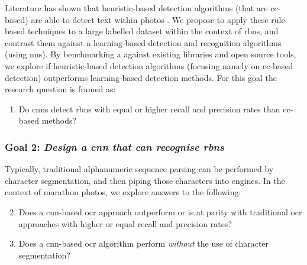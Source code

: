 Literature has shown that heuristic-based detection algorithms (that are \gls{cc}-based) are able to detect text within photos \citep{Li:2012wd, Chen:2011ul, Eichner:2008dw}. We propose to apply these rule-based techniques to a large labelled dataset within the context of \glspl{rbn}, and contrast them against a learning-based detection and recognition algorithms (using \glspl{nn}). By benchmarking a against existing libraries and open source tools, we explore if heuristic-based detection algorithms (focusing namely on \gls{cc}-based detection) outperforms learning-based detection methods.
For this goal the research question is framed as:
\begin{enumerate}[label=\bfseries~RQ\arabic*), leftmargin=2cm, rightmargin=1.5cm]
  \item\label{rq:1} Do \glspl{cnn} detect \glspl{rbn} with equal or higher recall and precision rates than \gls{cc}-based methods?
\end{enumerate}

\subsubsection*{Goal 2: \itshape Design a \gls{cnn} that can recognise \glspl{rbn}}

Typically, traditional alphanumeric sequence parsing can be performed by character segmentation, and then piping those characters into  engines.
In the context of marathon photos, we explore answers to the following:
\begin{enumerate}[label=\bfseries~RQ\arabic*), leftmargin=2cm, rightmargin=1.5cm]
  \setcounter{enumi}{1}
  \item\label{rq:2} Does a \gls{cnn}-based \gls{ocr} approach outperform or is at parity with traditional \gls{ocr} approaches with higher or equal recall and precision rates?
  \item\label{rq:3} Does a \gls{cnn}-based \gls{ocr} algorithm perform \textit{without} the use of character segmentation?
\end{enumerate}


